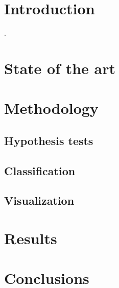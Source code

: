 \documentclass[conference]{IEEEtran}
\begin{document}
\section{Introduction}\label{introduction}
. 



\section{State of the art}\label{soa}





\section{Methodology}
\label{sec:method}


\subsection{Hypothesis tests}



\subsection{Classification}

\subsection{Visualization}





\section{Results}
\label{res}




\section{Conclusions}\label{conc}




\end{document}
